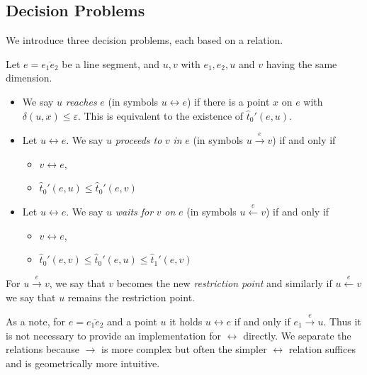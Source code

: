 \subsection{Decision Problems}
We introduce three decision problems, each based on a relation. 
\begin{definition}\label{def:implicit_relations}
  Let \(e = \overline{e_1e_2}\) be a line segment, and \(u, v\) with \(e_1, e_2, u\) and \(v\) having the same dimension. 
  \begin{itemize}
    \item We say \(u\) \emph{reaches} \(e\) (in symbols \(u \leftrightarrow e\)) if there is a point \(x\) on \(e\) with \(\delta(u,x)\leq \varepsilon\). This is equivalent to the existence of \(\hat t_0'(e, u)\).
    \item Let \(u \leftrightarrow e\). We say \(u\) \emph{proceeds to} \(v\) \emph{in} \(e\) (in symbols \(u \overset{e}\rightarrow v\)) if and only if 
      \begin{itemize}
        \item \(v \leftrightarrow e\), 
        \item \(\hat t_0'(e, u) \leq \hat t_0'(e, v)\)
      \end{itemize}

    \item Let \(u \leftrightarrow e\). We say \(u\) \emph{waits for} \(v\) \emph{on} \(e\) (in symbols \(u \overset{e}\leftarrow v\)) if and only if
      \begin{itemize}
        \item \(v \leftrightarrow e\), 
        \item \(\hat t_0'(e, v) \leq \hat t_0'(e, u) \leq \hat t_1'(e, v)\)
      \end{itemize}
  \end{itemize}
  For \(u \overset e\rightarrow v\), we say that \(v\) becomes the new \emph{restriction point} and similarly if \(u \overset e\leftarrow v\) we say that \(u\) remains the restriction point.
\end{definition}

As a note, for \(e = \overline{e_1e_2}\) and a point \(u\) it holds \(u \leftrightarrow e\) if and only if \(e_1 \overset{e}\rightarrow u\). Thus it is not necessary to provide an implementation for \(\leftrightarrow\) directly. We separate the relations because \(\rightarrow\) is more complex but often the simpler \(\leftrightarrow\) relation suffices and is geometrically more intuitive.

